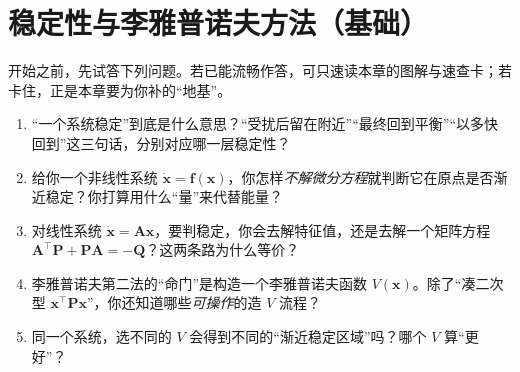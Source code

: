 \chapter{稳定性与李雅普诺夫方法（基础）}
\label{ch:lyapunov-basics}


\begin{practice}[前置自测]
开始之前，先试答下列问题。若已能流畅作答，可只速读本章的图解与速查卡；若卡住，正是本章要为你补的“地基”。
\begin{enumerate}
  \item “一个系统稳定”到底是什么意思？“受扰后留在附近”“最终回到平衡”“以多快回到”这三句话，分别对应哪一层稳定性？
  \item 给你一个非线性系统 $\dot{\mathbf{x}}=\mathbf{f}(\mathbf{x})$，你怎样\emph{不解微分方程}就判断它在原点是否渐近稳定？你打算用什么“量”来代替能量？
  \item 对线性系统 $\dot{\mathbf{x}}=\mathbf{A}\mathbf{x}$，要判稳定，你会去解特征值，还是去解一个矩阵方程 $\mathbf{A}^\top\mathbf{P}+\mathbf{P}\mathbf{A}=-\mathbf{Q}$？这两条路为什么等价？
  \item 李雅普诺夫第二法的“命门”是构造一个李雅普诺夫函数 $V(\mathbf{x})$。除了“凑二次型 $\mathbf{x}^\top\mathbf{P}\mathbf{x}$”，你还知道哪些\emph{可操作}的造 $V$ 流程？
  \item 同一个系统，选不同的 $V$ 会得到不同的“渐近稳定区域”吗？哪个 $V$ 算“更好”？
\end{enumerate}
\end{practice}

